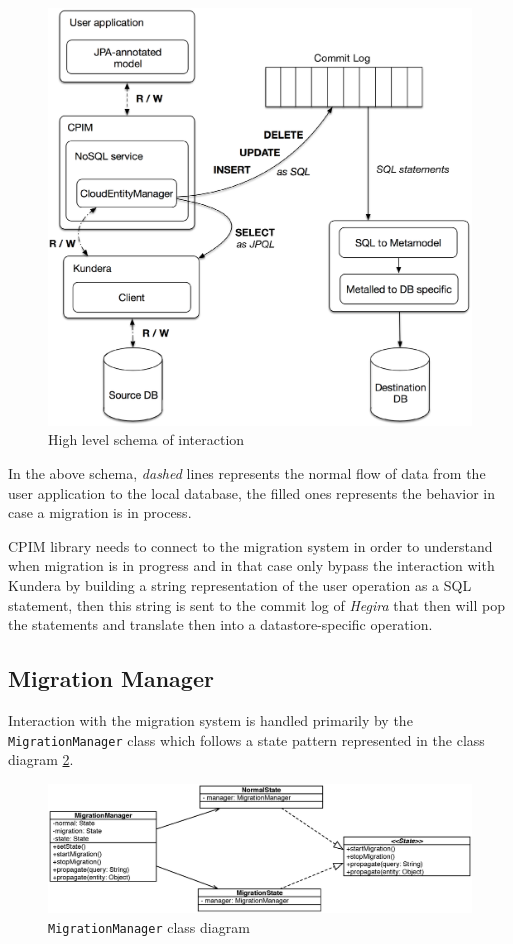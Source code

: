 \begin{figure}[tbh]
  \centering
  \includegraphics[width=12cm]{images/high_level_interaction}
  \caption{High level schema of interaction}
  \label{fig:high-level-interaction}
\end{figure} 

\noindent In the above schema, \textit{dashed} lines represents the normal flow of data from the user application to the local database, the filled ones represents the behavior in case a migration is in process.

\noindent CPIM library needs to connect to the migration system in order to understand when migration is in progress and in that case only bypass the interaction with Kundera by building a string representation of the user operation as a SQL statement, then this string is sent to the commit log of \textit{Hegira} that then will pop the statements and translate then into a datastore-specific operation.

\subsection{Migration Manager}
Interaction with the migration system is handled primarily by the \texttt{MigrationManager} class which follows a state pattern represented in the class diagram \ref{fig:migration-class-diagram}. 
 
\begin{figure}[tbh]
  \centering
  \includegraphics[width=14cm]{images/migration_class_diagram}
  \caption{\texttt{MigrationManager} class diagram}
  \label{fig:migration-class-diagram}
\end{figure} 

